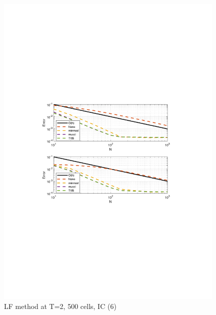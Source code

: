 \documentclass[11pt,a4paper]{article}
\begin{document}
\begin{figure}[!htb]
    \centering
    \includegraphics[width=11cm]{2_2_c_IC_2_LF.pdf}
    \caption{LF method at T=2, 500 cells, IC (6)}
    \label{fig:LF_IC_2_error}
\end{figure}
\end{document}
